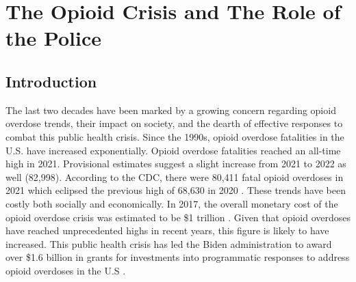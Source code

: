 \chapter{The Opioid Crisis and The Role of the Police}


\section{Introduction}

The last two decades have been marked by a growing concern regarding opioid overdose trends, their impact on society, and the dearth of effective responses to combat this public health crisis. Since the 1990s, opioid overdose fatalities in the U.S. have increased exponentially. Opioid overdose fatalities reached an all-time high in 2021. Provisional estimates suggest a slight increase from 2021 to 2022 as well (82,998). According to the CDC, there were 80,411 fatal opioid overdoses in 2021 which eclipsed the previous high of 68,630 in 2020 \parencite{national_institute_on_drug_abuse_drug_2023}. These trends have been costly both socially and economically. In 2017, the overall monetary cost of the opioid overdose crisis was estimated to be \$1 trillion \parencite{luo_state-level_2021}. Given that opioid overdoses have reached unprecedented highs in recent years, this figure is likely to have increased. This public health crisis has led the Biden administration to award over \$1.6 billion in grants for investments into programmatic responses to address opioid overdoses in the U.S \parencite{us_department_of_health_and_human_services_biden-harris_2022}.

